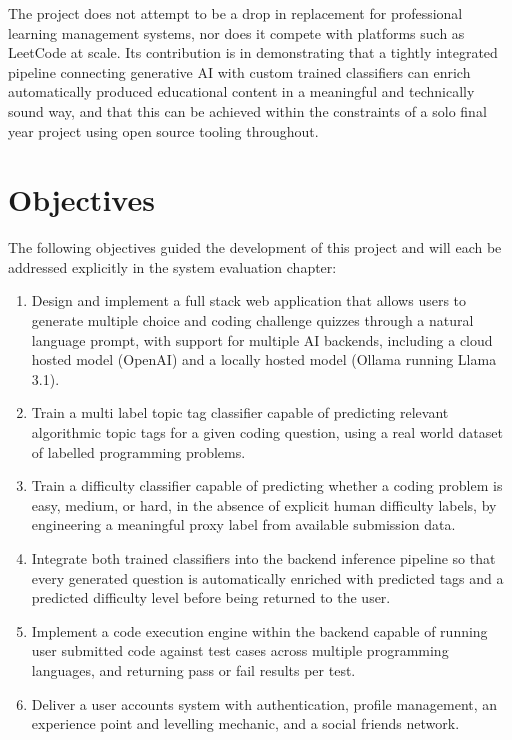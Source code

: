 The project does not attempt to be a drop in replacement for professional
learning management systems, nor does it compete with platforms such as
LeetCode at scale. Its contribution is in demonstrating that a tightly
integrated pipeline connecting generative AI with custom trained classifiers
can enrich automatically produced educational content in a meaningful and
technically sound way, and that this can be achieved within the constraints
of a solo final year project using open source tooling throughout.

\section{Objectives}

The following objectives guided the development of this project and will
each be addressed explicitly in the system evaluation chapter:

\begin{enumerate}
    \item Design and implement a full stack web application that allows
    users to generate multiple choice and coding challenge quizzes through
    a natural language prompt, with support for multiple AI backends,
    including a cloud hosted model (OpenAI) and a locally hosted model
    (Ollama running Llama 3.1).
    \item Train a multi label topic tag classifier capable of predicting
    relevant algorithmic topic tags for a given coding question, using a
    real world dataset of labelled programming problems.
    \item Train a difficulty classifier capable of predicting whether a
    coding problem is easy, medium, or hard, in the absence of explicit
    human difficulty labels, by engineering a meaningful proxy label from
    available submission data.
    \item Integrate both trained classifiers into the backend inference
    pipeline so that every generated question is automatically enriched
    with predicted tags and a predicted difficulty level before being
    returned to the user.
    \item Implement a code execution engine within the backend capable of
    running user submitted code against test cases across multiple
    programming languages, and returning pass or fail results per test.
    \item Deliver a user accounts system with authentication, profile
    management, an experience point and levelling mechanic, and a social
    friends network.
\end{enumerate}

